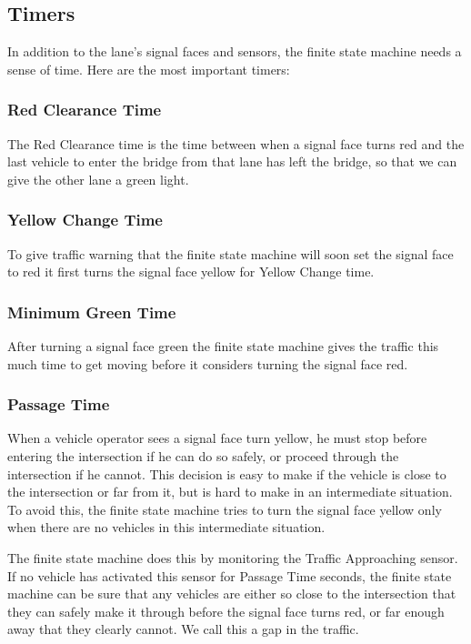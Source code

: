 \documentclass[letterpaper,twoside]{article}
\begin{document}
\subsection{Timers}

In addition to the lane's signal faces and sensors, the
finite state machine needs a sense of time.  Here are the most
important timers:

\subsubsection{Red Clearance Time}
The Red Clearance time is the time between when a signal face turns red
and the last vehicle to enter the bridge from that lane has left the
bridge, so that we can give the other lane a green light.

\subsubsection{Yellow Change Time}
To give traffic warning that the finite state machine will soon
set the signal face to red it first turns the signal face yellow
for Yellow Change time.

\subsubsection{Minimum Green Time}
After turning a signal face green the finite state machine
gives the traffic this much time to get moving before it considers
turning the signal face red.

\subsubsection{Passage Time}
When a vehicle operator sees a signal face turn yellow, he must stop
before entering the intersection if he can do so safely, or proceed
through the intersection if he cannot.  This decision is easy to make
if the vehicle is close to the intersection or far from it, but is hard
to make in an intermediate situation.  To avoid this, the finite state
machine tries to turn the signal face yellow only when there are no
vehicles in this intermediate situation.

The finite state machine does this by monitoring the Traffic Approaching
sensor.  If no vehicle has activated this sensor for Passage Time seconds,
the finite state machine can be sure that any vehicles are either so close
to the intersection that they can safely make it through before the signal
face turns red, or far enough away that they clearly cannot.
We call this a gap in the traffic.
\end{document}
